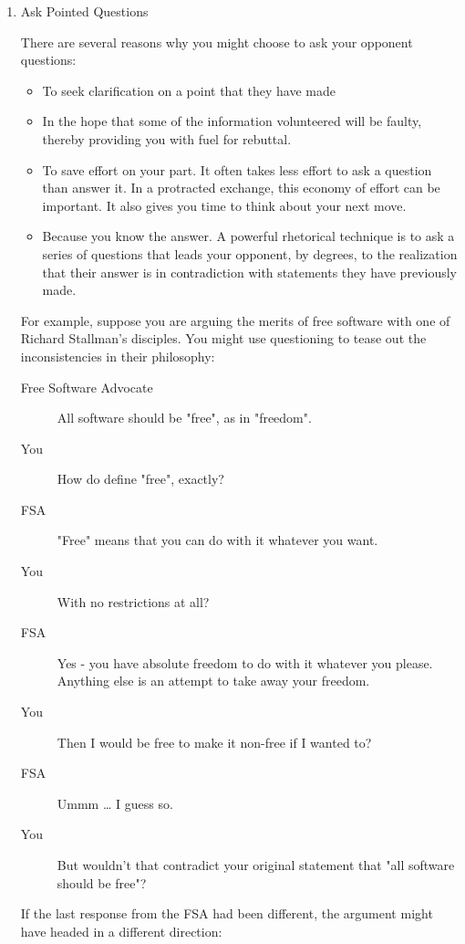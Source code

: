 \documentclass{article}
\begin{document}
\begin{enumerate}
\item Ask Pointed Questions
\label{sec:orgheadline83}

There are several reasons why you might choose to ask your opponent
questions:

\begin{itemize}
\item To seek clarification on a point that they have made
\item In the hope that some of the information volunteered will be faulty,
thereby providing you with fuel for rebuttal.
\item To save effort on your part. It often takes less effort to ask a
question than answer it. In a protracted exchange, this economy of
effort can be important. It also gives you time to think about your
next move.
\item Because you know the answer. A powerful rhetorical technique is to
ask a series of questions that leads your opponent, by degrees, to
the realization that their answer is in contradiction with statements
they have previously made.
\end{itemize}

For example, suppose you are arguing the merits of free software with
one of Richard Stallman's disciples. You might use questioning to tease
out the inconsistencies in their philosophy:

\begin{description}
\item[{Free Software Advocate}] All software should be "free", as in
"freedom".
\item[{You}] How do define "free", exactly?
\item[{FSA}] "Free" means that you can do with it whatever you want.
\item[{You}] With no restrictions at all?
\item[{FSA}] Yes - you have absolute freedom to do with it whatever you
please. Anything else is an attempt to take away your freedom.
\item[{You}] Then I would be free to make it non-free if I wanted to?
\item[{FSA}] Ummm \ldots{} I guess so.
\item[{You}] But wouldn't that contradict your original statement that "all
software should be free"?
\end{description}

If the last response from the FSA had been different, the argument might
have headed in a different direction:


\end{enumerate}
\end{document}
